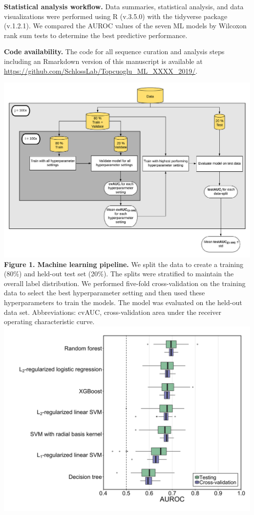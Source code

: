 \documentclass[11pt,]{article}
\begin{document}
\textbf{Statistical analysis workflow.} Data summaries, statistical
analysis, and data visualizations were performed using R (v.3.5.0) with
the tidyverse package (v.1.2.1). We compared the AUROC values of the
seven ML models by Wilcoxon rank sum tests to determine the best
predictive performance.

\textbf{Code availability.} The code for all sequence curation and
analysis steps including an Rmarkdown version of this manuscript is
available at
\url{https://github.com/SchlossLab/Topcuoglu_ML_XXXX_2019/}.

\newpage

\includegraphics{Figure_1} \textbf{Figure 1. Machine learning pipeline.
} We split the data to create a training (80\%) and held-out test set
(20\%). The splits were stratified to maintain the overall label
distribution. We performed five-fold cross-validation on the training
data to select the best hyperparameter setting and then used these
hyperparameters to train the models. The model was evaluated on the
held-out data set. Abbreviations: cvAUC, cross-validation area under the
receiver operating characteristic curve. \newpage
\includegraphics{Figure_2.png}
\end{document}

